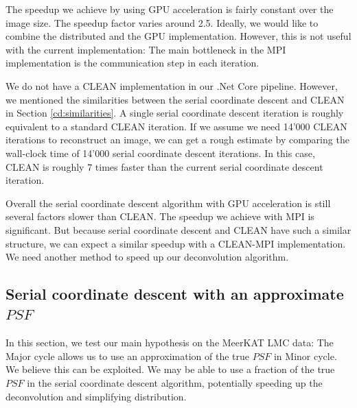 The speedup we achieve by using GPU acceleration is fairly constant over the image size. The speedup factor varies around 2.5. Ideally, we would like to combine the distributed and the GPU implementation. However, this is not useful with the current implementation: The main bottleneck in the MPI implementation is the communication step in each iteration. 

We do not have a CLEAN implementation in our .Net Core pipeline. However, we mentioned the similarities between the serial coordinate descent and CLEAN in Section \ref{cd:similarities}. A single serial coordinate descent iteration is roughly equivalent to a standard CLEAN iteration. If we assume we need 14'000 CLEAN iterations to reconstruct an image, we can get a rough estimate by comparing the wall-clock time of 14'000 serial coordinate descent iterations. In this case, CLEAN is roughly 7 times faster than the current serial coordinate descent iteration.

Overall the serial coordinate descent algorithm with GPU acceleration is still several factors slower than CLEAN. The speedup we achieve with MPI is significant. But because serial coordinate descent and CLEAN have such a similar structure, we can expect a similar speedup with a CLEAN-MPI implementation. We need another method to speed up our deconvolution algorithm.


\subsection{Serial coordinate descent with an approximate $PSF$} \label{results:gradients}
In this section, we test our main hypothesis on the MeerKAT LMC data: The Major cycle allows us to use an approximation of the true $PSF$ in Minor cycle. We believe this can be exploited. We may be able to use a fraction of the true $PSF$ in the serial coordinate descent algorithm, potentially speeding up the deconvolution and simplifying distribution.

